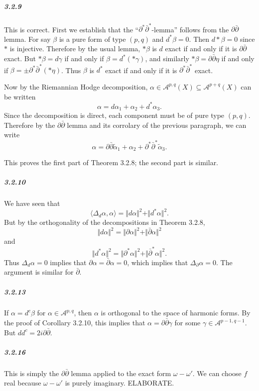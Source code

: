 \documentclass[10pt,letter]{article}
\begin{document}
\subparagraph{3.2.9} This is correct. First we establish that the ``$\partial^{\ast}\bar{\partial}^{\ast}$-lemma'' follows from the $\partial \bar{\partial}$ lemma. For say $\beta$ is a pure form of type $(p,q)$ and $d^\ast \beta = 0$. Then $d \ast \beta = 0$ since $\ast$ is injective. Therefore by the usual lemma, $\ast \beta$ is $d$ exact if and only if it is $\partial \bar{\partial}$ exact. But $\ast \beta = d \gamma$ if and only if $\beta = d^{\ast} (\ast \gamma)$, and similarly $\ast \beta = \partial \bar{\partial} \eta$ if and only if $\beta = \pm \partial^{\ast} \bar{\partial}^{\ast} (\ast \eta)$. Thus $\beta$ is $d^{\ast}$ exact if and only if it is $\partial^{\ast} \bar{\partial}^{\ast}$ exact.  

Now by the Riemannian Hodge decomposition, $\alpha \in \mathcal{A}^{p,q}(X) \subseteq \mathcal{A}^{p+q}(X)$ can be written
\[ \alpha = d\alpha_1 + \alpha_2 + d^{\ast} \alpha_3.\]
Since the decomposition is direct, each component must be of pure type $(p,q)$. Therefore by the $\partial \bar{\partial}$ lemma and its corrolary of the previous paragraph, we can write
\[ \alpha = \partial \bar{\partial} \tilde{\alpha}_1 + \alpha_2 + \partial^{\ast} \bar \partial^{\ast} \tilde{\alpha}_3.\]

This proves the first part of Theorem 3.2.8; the second part is similar.

\subparagraph{3.2.10} We have seen that 
\[ \langle \Delta_{d} \alpha, \alpha \rangle = \Vert d\alpha \Vert^2 + \Vert d^{\ast}\alpha \Vert^2.\]
But by the orthogonality of the decompositions in Theorem 3.2.8,
\[ \Vert d\alpha \Vert^2 = \Vert \partial \alpha \Vert^2 + \Vert \bar{\partial} \alpha \Vert^2\] and 
\[ \Vert d^{\ast}\alpha \Vert^2 = \Vert \partial^{\ast} \alpha \Vert^2 + \Vert \bar{\partial}^{\ast} \alpha \Vert^2.\]
Thus $\Delta_{d} \alpha = 0$ implies that $\partial \alpha = \bar{\partial} \alpha = 0$, which implies that $\Delta_{\partial}\alpha = 0$. The argument is similar for $\bar{\partial}$.

\subparagraph{3.2.13} If $\alpha = d^c \beta$ for $\alpha \in \mathcal{A}^{p,q}$, then $\alpha$ is orthogonal to the space of harmonic forms. By the proof of Corollary 3.2.10, this implies that $\alpha = \partial \bar{\partial} \gamma$ for some $\gamma \in \mathcal{A}^{p-1,q-1}$. But $d d^c = 2i \partial \bar{\partial}$.  

\subparagraph{3.2.16} This is simply the $\partial \bar{\partial}$ lemma applied to the exact form $\omega - \omega'$. We can choose $f$ real because $\omega - \omega'$ is purely imaginary. ELABORATE. 
\end{document}

